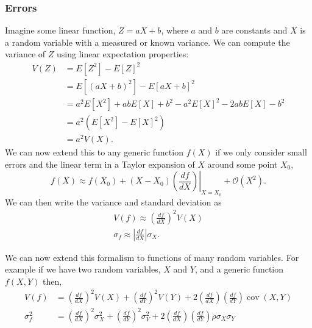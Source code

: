 \documentclass[12pt,a4paper]{article}
\begin{document}
\subsubsection{Errors}
Imagine some linear function, $Z=a X+b$, where $a$ and $b$ are constants and $X$ is a random variable with a measured or known variance. We can compute the variance of $Z$ using linear expectation properties:
\begin{equation*}
\begin{aligned}
V(Z) & =E\left[Z^2\right]-E[Z]^2 \\
& =E\left[(a X+b)^2\right]-E[a X+b]^2 \\
& =a^2 E\left[X^2\right]+a b E[X]+b^2-a^2 E[X]^2-2 a b E[X]-b^2 \\
& =a^2\left(E\left[X^2\right]-E[X]^2\right) \\
& =a^2 V(X) .
\end{aligned}
\end{equation*}
We can now extend this to any generic function $f(X)$ if we only consider small errors and the linear term in a Taylor expansion of $X$ around some point $X_0$,
\begin{equation*}
f(X) \approx f\left(X_0\right)+\left.\left(X-X_0\right)\left(\frac{d f}{d X}\right)\right|_{X=X_0}+\mathcal{O}\left(X^2\right) .
\end{equation*}
We can then write the variance and standard deviation as
\begin{equation*}
\begin{gathered}
V(f) \approx\left(\frac{d f}{d X}\right)^2 V(X) \\
\sigma_f \approx\left|\frac{d f}{d X}\right| \sigma_X .
\end{gathered}
\end{equation*}

We can now extend this formalism to functions of many random variables. For example if we have two random variables, $X$ and $Y$, and a generic function $f(X, Y)$ then,
\begin{equation*}
\begin{aligned}
V(f) & =\left(\frac{d f}{d X}\right)^2 V(X)+\left(\frac{d f}{d Y}\right)^2 V(Y)+2\left(\frac{d f}{d X}\right)\left(\frac{d f}{d Y}\right) \operatorname{cov}(X, Y) \\
\sigma_f^2 & =\left(\frac{d f}{d X}\right)^2 \sigma_X^2+\left(\frac{d f}{d Y}\right)^2 \sigma_Y^2+2\left(\frac{d f}{d X}\right)\left(\frac{d f}{d Y}\right) \rho \sigma_X \sigma_Y
\end{aligned}
\end{equation*}
\end{document}

